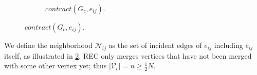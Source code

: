 \begin{figure}
\begin{minipage}{0.4\linewidth}
\begin{figure}[H]
			\caption{$\mathit{contract}(G_c, e_{i j})$.}\label{fig:coarse:rec}
		\end{figure}
	\end{minipage}
\end{figure}

We define the neighborhood $\mathcal{N}_{i j}$ as the set of incident edges of $e_{i j}$ including $e_{i j}$ itself, as illustrated in \cref{fig:coarse:rec}.
REC only merges vertices that have not been merged with some other vertex yet; thus \@ $|\mathcal{V}_c| = n \geq \frac{1}{2} N$.
